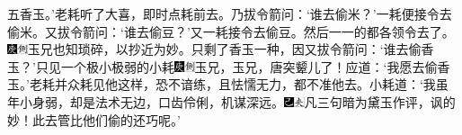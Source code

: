 五香玉。’老耗听了大喜，即时点耗前去。乃拔令箭问：‘谁去偷米？’一耗便接令去偷米。又拔令箭问：‘谁去偷豆？’又一耗接令去偷豆。然后一一的都各领令去了。{\includegraphics[width=3mm]{../Images/00004}\includegraphics[width=3mm]{../Images/00011}\footnotesize \kaishu 玉兄也知琐碎，以抄近为妙。}只剩了香玉一种，因又拔令箭问：‘谁去偷香玉？’只见一个极小极弱的小耗{\includegraphics[width=3mm]{../Images/00004}\includegraphics[width=3mm]{../Images/00011}\footnotesize \kaishu 玉兄，玉兄，唐突颦儿了！}应道：‘我愿去偷香玉。’老耗并众耗见他这样，恐不谙练，且怯懦无力，都不准他去。小耗道：‘我虽年小身弱，却是法术无边，口齿伶俐，机谋深远。{\includegraphics[width=3mm]{../Images/00003}\includegraphics[width=3mm]{../Images/00012}\footnotesize \kaishu 凡三句暗为黛玉作评，讽的妙！}此去管比他们偷的还巧呢。’